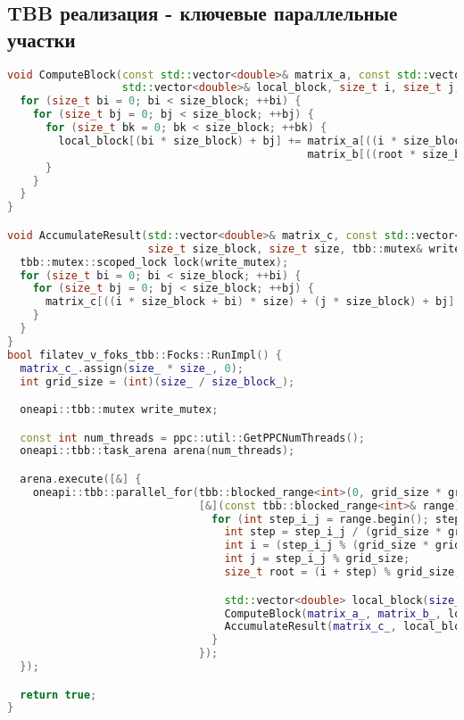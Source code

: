 \documentclass[12pt]{article}
\begin{document}
\subsection{TBB реализация - ключевые параллельные участки}
\begin{lstlisting}[language=C++]
void ComputeBlock(const std::vector<double>& matrix_a, const std::vector<double>& matrix_b,
                  std::vector<double>& local_block, size_t i, size_t j, size_t root, size_t size_block, size_t size) {
  for (size_t bi = 0; bi < size_block; ++bi) {
    for (size_t bj = 0; bj < size_block; ++bj) {
      for (size_t bk = 0; bk < size_block; ++bk) {
        local_block[(bi * size_block) + bj] += matrix_a[((i * size_block + bi) * size) + (root * size_block) + bk] *
                                               matrix_b[((root * size_block + bk) * size) + (j * size_block) + bj];
      }
    }
  }
}

void AccumulateResult(std::vector<double>& matrix_c, const std::vector<double>& local_block, size_t i, size_t j,
                      size_t size_block, size_t size, tbb::mutex& write_mutex) {
  tbb::mutex::scoped_lock lock(write_mutex);
  for (size_t bi = 0; bi < size_block; ++bi) {
    for (size_t bj = 0; bj < size_block; ++bj) {
      matrix_c[((i * size_block + bi) * size) + (j * size_block) + bj] += local_block[(bi * size_block) + bj];
    }
  }
}
bool filatev_v_foks_tbb::Focks::RunImpl() {
  matrix_c_.assign(size_ * size_, 0);
  int grid_size = (int)(size_ / size_block_);

  oneapi::tbb::mutex write_mutex;

  const int num_threads = ppc::util::GetPPCNumThreads();
  oneapi::tbb::task_arena arena(num_threads);

  arena.execute([&] {
    oneapi::tbb::parallel_for(tbb::blocked_range<int>(0, grid_size * grid_size * grid_size),
                              [&](const tbb::blocked_range<int>& range) {
                                for (int step_i_j = range.begin(); step_i_j != range.end(); ++step_i_j) {
                                  int step = step_i_j / (grid_size * grid_size);
                                  int i = (step_i_j % (grid_size * grid_size)) / grid_size;
                                  int j = step_i_j % grid_size;
                                  size_t root = (i + step) % grid_size;

                                  std::vector<double> local_block(size_block_ * size_block_, 0);
                                  ComputeBlock(matrix_a_, matrix_b_, local_block, i, j, root, size_block_, size_);
                                  AccumulateResult(matrix_c_, local_block, i, j, size_block_, size_, write_mutex);
                                }
                              });
  });

  return true;
}
\end{lstlisting}
\newpage
\end{document}
